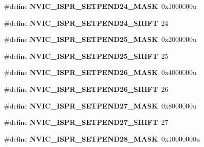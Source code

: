 \begin{DoxyCompactItemize}
\#define {\bfseries N\+V\+I\+C\+\_\+\+I\+S\+P\+R\+\_\+\+S\+E\+T\+P\+E\+N\+D24\+\_\+\+M\+A\+SK}~0x1000000u
\item 
\mbox{\label{group___n_v_i_c___register___masks_ga112b2981765398fa8be57b7a6c99d604}} 
\#define {\bfseries N\+V\+I\+C\+\_\+\+I\+S\+P\+R\+\_\+\+S\+E\+T\+P\+E\+N\+D24\+\_\+\+S\+H\+I\+FT}~24
\item 
\mbox{\label{group___n_v_i_c___register___masks_ga7c53bed8116b67b5b159a94ef34957d5}} 
\#define {\bfseries N\+V\+I\+C\+\_\+\+I\+S\+P\+R\+\_\+\+S\+E\+T\+P\+E\+N\+D25\+\_\+\+M\+A\+SK}~0x2000000u
\item 
\mbox{\label{group___n_v_i_c___register___masks_ga57125bf077cd77ad80119637573bcd37}} 
\#define {\bfseries N\+V\+I\+C\+\_\+\+I\+S\+P\+R\+\_\+\+S\+E\+T\+P\+E\+N\+D25\+\_\+\+S\+H\+I\+FT}~25
\item 
\mbox{\label{group___n_v_i_c___register___masks_ga40fddaab65a35bed51cb06d7320fd3bf}} 
\#define {\bfseries N\+V\+I\+C\+\_\+\+I\+S\+P\+R\+\_\+\+S\+E\+T\+P\+E\+N\+D26\+\_\+\+M\+A\+SK}~0x4000000u
\item 
\mbox{\label{group___n_v_i_c___register___masks_gaaaba3f6dccbe5892f346640a02354e9e}} 
\#define {\bfseries N\+V\+I\+C\+\_\+\+I\+S\+P\+R\+\_\+\+S\+E\+T\+P\+E\+N\+D26\+\_\+\+S\+H\+I\+FT}~26
\item 
\mbox{\label{group___n_v_i_c___register___masks_ga65bae3f03b9bc52bea2f31bde858579a}} 
\#define {\bfseries N\+V\+I\+C\+\_\+\+I\+S\+P\+R\+\_\+\+S\+E\+T\+P\+E\+N\+D27\+\_\+\+M\+A\+SK}~0x8000000u
\item 
\mbox{\label{group___n_v_i_c___register___masks_ga7f7d1cb6d0529908a690578dee9b296e}} 
\#define {\bfseries N\+V\+I\+C\+\_\+\+I\+S\+P\+R\+\_\+\+S\+E\+T\+P\+E\+N\+D27\+\_\+\+S\+H\+I\+FT}~27
\item 
\mbox{\label{group___n_v_i_c___register___masks_ga7943b19d13fdb76d9556da4ec2047b17}} 
\#define {\bfseries N\+V\+I\+C\+\_\+\+I\+S\+P\+R\+\_\+\+S\+E\+T\+P\+E\+N\+D28\+\_\+\+M\+A\+SK}~0x10000000u

\end{DoxyCompactItemize}

